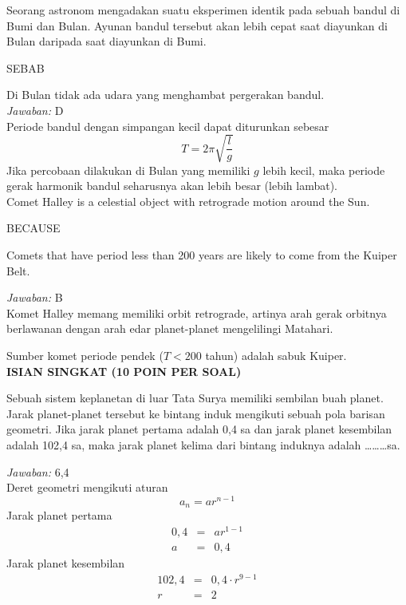 \documentclass[11pt,fleqn]{exam}
\begin{document}
\begin{questions}
\question Seorang astronom mengadakan suatu eksperimen identik pada sebuah bandul di Bumi dan Bulan. Ayunan bandul tersebut akan lebih cepat saat diayunkan di Bulan daripada saat diayunkan di Bumi.
\begin{center}
SEBAB
\end{center}
Di Bulan tidak ada udara yang menghambat pergerakan bandul.\\

\textit{Jawaban: } D\\

Periode bandul dengan simpangan kecil dapat diturunkan sebesar
\begin{equation*}
T = 2 \pi \sqrt{\frac{l}{g}}
\end{equation*}
Jika percobaan dilakukan di Bulan yang memiliki $g$ lebih kecil, maka periode gerak harmonik bandul seharusnya akan lebih besar (lebih lambat).\\


\question Comet Halley is a celestial object with retrograde motion around the Sun.
\begin{center}
BECAUSE
\end{center}
Comets that have period less than 200 years are likely to come from the Kuiper Belt.

\textit{Jawaban: } B\\

Komet Halley memang memiliki orbit retrograde, artinya arah gerak orbitnya berlawanan dengan arah edar planet-planet mengelilingi Matahari.

Sumber komet periode pendek ($T < 200$ tahun) adalah sabuk Kuiper.\\

\vspace{0.5cm}
\textbf{ISIAN SINGKAT (10 POIN PER SOAL)}

\question Sebuah sistem keplanetan di luar Tata Surya memiliki sembilan buah planet. Jarak planet-planet tersebut ke bintang induk mengikuti sebuah pola barisan geometri. Jika jarak planet pertama adalah 0,4 sa dan jarak planet kesembilan adalah 102,4 sa, maka jarak planet kelima dari bintang induknya adalah \ldots\ldots\ldots sa.

\textit{Jawaban: } 6,4\\

Deret geometri mengikuti aturan
\begin{equation*}
a_n = a r^{n-1}
\end{equation*}
Jarak planet pertama 
\begin{eqnarray*}
0,4 &=& a r^{1-1} \\
a &=& 0,4
\end{eqnarray*}
Jarak planet kesembilan
\begin{eqnarray*}
102,4 &=& 0,4 \cdot r^{9 - 1}\\
r &=& 2
\end{eqnarray*} 


\end{questions}
\end{document}
